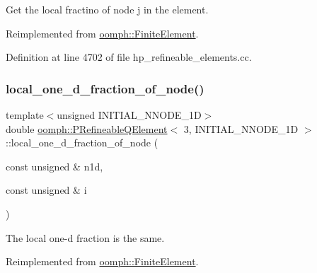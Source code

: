 Get the local fractino of node j in the element. 



Reimplemented from \hyperlink{classoomph_1_1FiniteElement_a41640b9a9e5f6461cd8ebb8218502b07}{oomph\+::\+Finite\+Element}.



Definition at line 4702 of file hp\+\_\+refineable\+\_\+elements.\+cc.

\mbox{\label{classoomph_1_1PRefineableQElement_3_013_00_01INITIAL__NNODE__1D_01_4_a7d01711b7996dbb88e14af17c7d35100}} 
\subsubsection{\texorpdfstring{local\+\_\+one\+\_\+d\+\_\+fraction\+\_\+of\+\_\+node()}{local\_one\_d\_fraction\_of\_node()}}
{\footnotesize\ttfamily template$<$unsigned I\+N\+I\+T\+I\+A\+L\+\_\+\+N\+N\+O\+D\+E\+\_\+1D$>$ \\
double \hyperlink{classoomph_1_1PRefineableQElement}{oomph\+::\+P\+Refineable\+Q\+Element}$<$ 3, I\+N\+I\+T\+I\+A\+L\+\_\+\+N\+N\+O\+D\+E\+\_\+1D $>$\+::local\+\_\+one\+\_\+d\+\_\+fraction\+\_\+of\+\_\+node (\begin{DoxyParamCaption}\item[{const unsigned \&}]{n1d,  }\item[{const unsigned \&}]{i }\end{DoxyParamCaption})\hspace{0.3cm}{\ttfamily [virtual]}}



The local one-\/d fraction is the same. 



Reimplemented from \hyperlink{classoomph_1_1FiniteElement_adb8ec7d2ceda37528c2d4542d572edf4}{oomph\+::\+Finite\+Element}.



